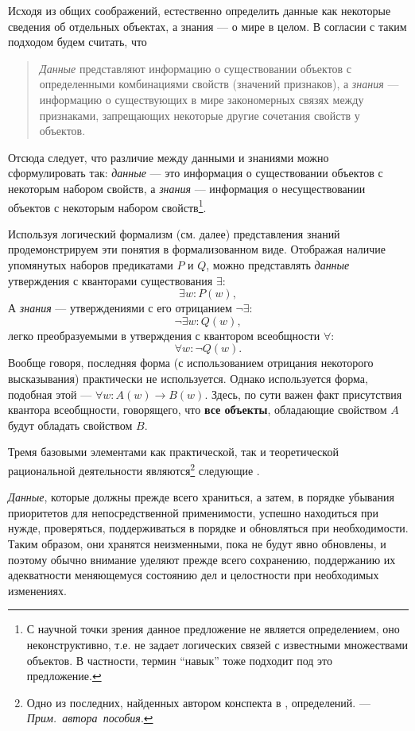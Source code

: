 \documentclass[12pt, openany, twoside]{book} %
\def\AR{{\em Прим.~автора~пособия}}
\begin{document}
Исходя из общих соображений, естественно определить данные как некоторые сведения об отдельных объектах, а знания --- о мире в целом. В согласии с таким подходом будем считать, что
\begin{quote}
{\em Данные} представляют информацию о существовании объектов с определенными комбинациями свойств\linebreak{} (значений признаков), а {\em знания} --- информацию о существующих в мире закономерных связях между признаками, запрещающих некоторые другие сочетания свойств у объектов.
\end{quote}

Отсюда следует, что различие между данными и знаниями можно сфор\-му\-ли\-ро\-вать так: {\em данные} --- это информация о существовании объектов с некоторым набором свойств, а {\em знания} --- информация о несуществовании объектов с некоторым набором свойств\footnote{С научной точки зрения данное предложение не является определением, оно неконструктивно, т.е. не задает логических связей с известными множествами объектов. В частности, термин ``навык'' тоже подходит под это предложение.}.

Используя логический формализм (см. далее) представления знаний продемонстрируем эти понятия в формализованном виде. Отображая наличие упомянутых наборов предикатами $P$ и $Q$, можно представлять {\em данные} утверждения с кванторами существования
$\exists$:
$$
    \exists w: P(w),
$$
А {\em знания} --- утверждениями с его отрицанием $\neg\exists$:
$$
    \neg\exists w: Q(w),
$$
легко преобразуемыми в утверждения с квантором всеобщности
$\forall$:
$$
    \forall w: \neg Q(w).
$$
Вообще говоря, последняя форма (с использованием отрицания некоторого высказывания) практически не используется. Однако используется форма, подобная этой --- $\forall w: A(w)\to B(w)$. Здесь, по сути важен факт присутствия квантора всеобщности, говорящего, что {\bf все объекты}, обладающие свойством $A$ будут обладать свойством $B$.

Тремя базовыми элементами как практической, так и теоретической рациональной деятельности являются\footnote{Одно из последних, найденных автором конспекта в \cite{DDWII}, определений. --- \AR.} следующие \cite{DDWII}.

    {\em Данные}, которые должны прежде всего храниться, а затем, в порядке убывания приоритетов для непосредственной применимости, успешно находиться при нужде, проверяться, поддерживаться в порядке и обновляться при необходимости. Таким образом, они хранятся неизменными, пока не будут явно обновлены, и поэтому обычно внимание уделяют прежде всего сохранению, поддержанию их адекватности меняющемуся состоянию дел и целостности при необходимых изменениях.
\end{document}
